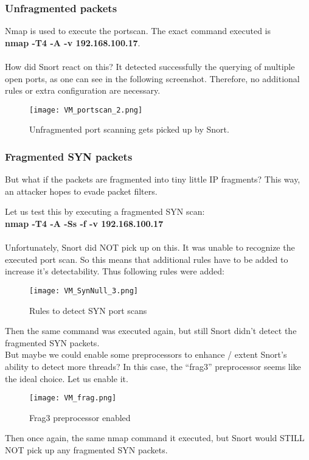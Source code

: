 \subsubsection{Unfragmented packets}

Nmap is used to execute the portscan. The exact command executed is \\
\textbf{nmap -T4 -A -v 192.168.100.17}. \\ \\
How did Snort react on this? It detected successfully the querying of multiple open ports, as one can see in the following screenshot. Therefore, no additional rules or extra configuration are necessary.

\begin{figure}[h]
    \centering
    \texttt{[image: VM\_portscan\_2.png]}
    \caption{Unfragmented port scanning gets picked up by Snort.}
\end{figure}
\clearpage
\subsubsection{Fragmented SYN packets}

But what if the packets are fragmented into tiny little IP fragments? This way, an attacker hopes to evade packet filters.

Let us test this by executing a fragmented SYN scan:\\
\textbf{nmap -T4 -A -Ss -f -v 192.168.100.17} \\ \\
Unfortunately, Snort did NOT pick up on this. It was unable to recognize the executed port scan. So this means that additional rules have to be added to increase it's detectability.
Thus following rules were added:
\begin{figure}[h]
    \centering
    \texttt{[image: VM\_SynNull\_3.png]}
    \caption{Rules to detect SYN port scans}
\end{figure}
Then the same command was executed again, but still Snort didn't detect the fragmented SYN packets. \\
But maybe we could enable some preprocessors to enhance / extent Snort's ability to detect more threads? In this case, the ``frag3'' preprocessor seems like the ideal choice. Let us enable it.
\begin{figure}[h]
    \centering
    \texttt{[image: VM\_frag.png]}
    \caption{Frag3 preprocessor enabled}
\end{figure}
Then once again, the same nmap command it executed, but Snort would STILL NOT pick up any fragmented SYN packets.

